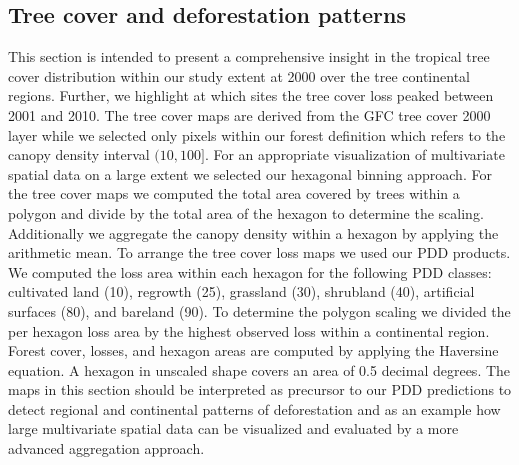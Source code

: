 		\subsection{Tree cover and deforestation patterns}
		\label{subsec:results_tree_cover_and_deforestation}
			This section is intended to present a comprehensive insight in the tropical tree cover distribution within our study extent at 2000 over the tree continental regions. Further, we highlight at which sites the tree cover loss peaked between 2001 and 2010. The tree cover maps are derived from the \ac{GFC} tree cover 2000 layer while we selected only pixels within our forest definition which refers to the canopy density interval $(10,100]$. For an appropriate visualization of multivariate spatial data on a large extent we selected our hexagonal binning approach. For the tree cover maps we computed the total area covered by trees within a polygon and divide by the total area of the hexagon to determine the scaling. Additionally we aggregate the canopy density within a hexagon by applying the arithmetic mean. To arrange the tree cover loss maps we used our \ac{PDD} products. We computed the loss area within each hexagon for the following \ac{PDD} classes: cultivated land (10), regrowth (25), grassland (30), shrubland (40), artificial surfaces (80), and bareland (90). To determine the polygon scaling we divided the per hexagon loss area by the highest observed loss within a continental region. Forest cover, losses, and hexagon areas are computed by applying the Haversine equation. A hexagon in unscaled shape covers an area of 0.5 decimal degrees. The maps in this section should be interpreted as precursor to our \ac{PDD} predictions to detect regional and continental patterns of deforestation and as an example how large multivariate spatial data can be visualized and evaluated by a more advanced aggregation approach.

